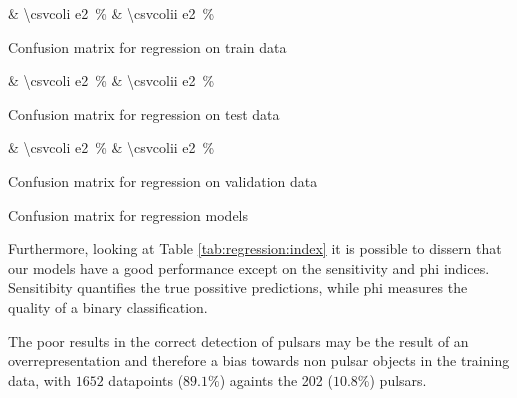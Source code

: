 \documentclass[journal]{IEEEtran}
\newcommand\percentage[2][round-precision = 2]{%
    \SI[round-mode = places,
        scientific-notation = fixed, fixed-exponent = 0,
        output-decimal-marker={.}, #1]{#2e2}{\percent}%
}
\begin{document}
\begin{table}    
    \begin{subtable}{0.49\linewidth}
        { & \percentage{\csvcoli} & \percentage{\csvcolii}}%
        \caption{Confusion matrix for regression on train data\label{tab:regression:CM:train}}
    \end{subtable}
    \hfill%
    \begin{subtable}{0.49\linewidth}
        { & \percentage{\csvcoli} & \percentage{\csvcolii}}%
        \caption{Confusion matrix for regression on test data\label{tab:regression:CM:test}}
    \end{subtable}

    \begin{subtable}{\linewidth}
        { & \percentage{\csvcoli} & \percentage{\csvcolii}}%
        \caption{Confusion matrix for regression on validation data\label{tab:regression:CM:validation}}
    \end{subtable}
    \caption{Confusion matrix for regression models\label{tab:regression:CM}}
\end{table}

Furthermore, looking at Table \ref{tab:regression:index} it is possible to
dissern that our models have a good performance except on the sensitivity and
phi indices. Sensitibity quantifies the true possitive predictions, while phi
measures the quality of a binary classification. 

The poor results in the correct detection of pulsars may be the result of an
overrepresentation and therefore a bias towards non pulsar objects in the
training data, with $1652$ datapoints ($89.1\%$) againts the 202 ($10.8\%$)
pulsars.
\end{document}
